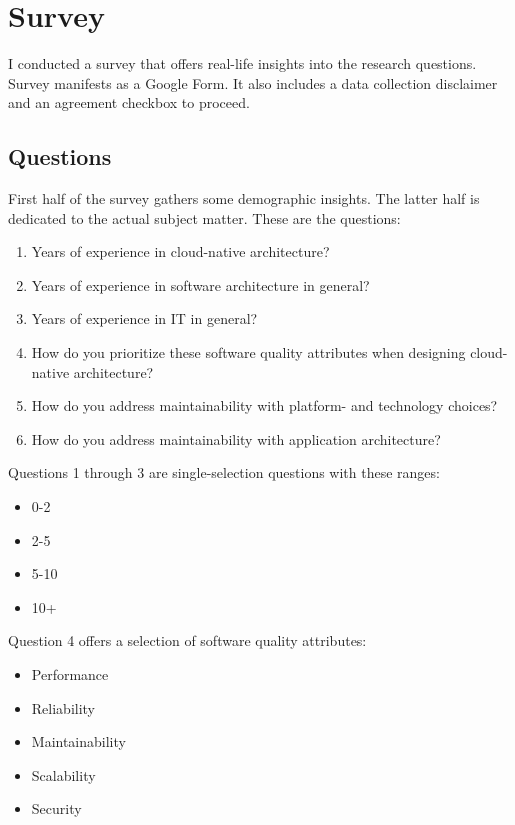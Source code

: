 \documentclass[utf8,english]{gradu3}
\begin{document}
\section{Survey}

I conducted a survey that offers real-life insights into the research questions.
Survey manifests as a Google Form.
It also includes a data collection disclaimer and an agreement checkbox to proceed.


\subsection{Questions}
First half of the survey gathers some demographic insights.
The latter half is dedicated to the actual subject matter.
These are the questions:
\begin{enumerate}
  \item Years of experience in cloud-native architecture?
  \item Years of experience in software architecture in general?
  \item Years of experience in IT in general?
  \item How do you prioritize these software quality attributes when designing cloud-native
        architecture?
  \item How do you address maintainability with platform- and technology choices?
  \item How do you address maintainability with application architecture?
\end{enumerate}

Questions 1 through 3 are single-selection questions with these ranges:
\begin{itemize}
  \item 0-2
  \item 2-5
  \item 5-10
  \item 10+
\end{itemize}

Question 4 offers a selection of software quality attributes:
\begin{itemize}
  \item Performance
  \item Reliability
  \item Maintainability
  \item Scalability
  \item Security
\end{itemize}
\end{document}
